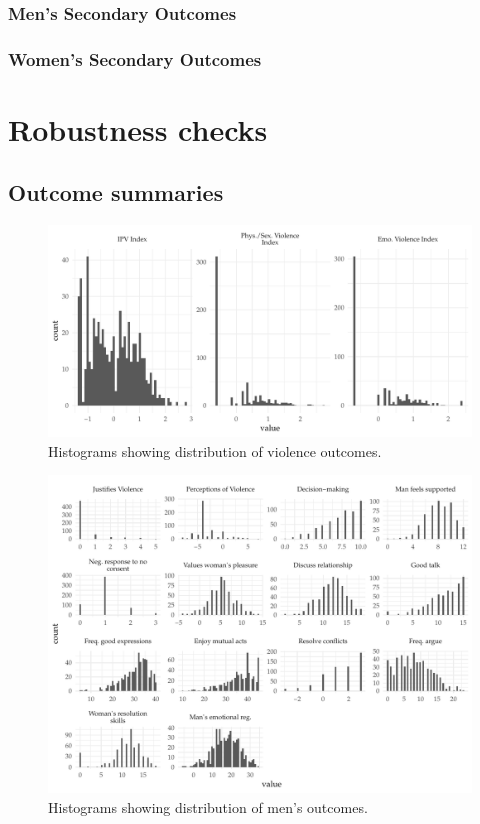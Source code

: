 \documentclass[11pt,english]{article}
\begin{document}
\subsubsection{Men's Secondary Outcomes}

\subsubsection{Women's Secondary Outcomes}

\section{Robustness checks}

\subsection{Outcome summaries}

\begin{figure}[H]
\centering
\includegraphics[width = \textwidth]{figures/distribution_violence.pdf}
\caption{Histograms showing distribution of violence outcomes.}
\label{fig:dist_violence}
\end{figure}

\begin{figure}[H]
\centering
\includegraphics[width = \textwidth]{figures/distribution_mens.pdf}
\caption{Histograms showing distribution of men's outcomes.}
\label{fig:dist_mens}
\end{figure}
\end{document}
